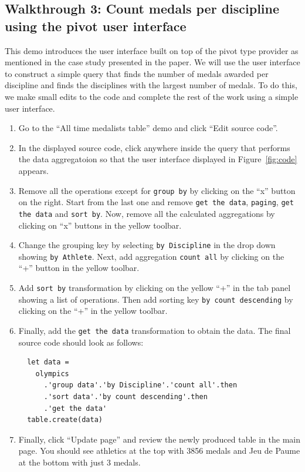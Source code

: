 \documentclass[a4paper,UKenglish]{darts}
\begin{document}
\begin{scope}
\subsection*{Walkthrough 3: Count medals per discipline using the pivot user interface}

This demo introduces the user interface built on top of the pivot type provider as mentioned in the
case study presented in the paper. We will use the user interface to construct a simple query that
finds the number of medals awarded per discipline and finds the disciplines with the largest number
of medals. To do this, we make small edits to the code and complete the rest of the work using
a simple user interface.

\begin{enumerate}
\item Go to the ``All time medalists table'' demo and click ``Edit source code''.
\item In the displayed source code, click anywhere inside the query that performs the data aggregatoion
  so that the user interface displayed in Figure~\ref{fig:code} appears.
\item Remove all the operations except for \texttt{group by} by clicking on the ``x'' button on 
  the right. Start from the last one and remove \texttt{get the data}, \texttt{paging},
  \texttt{get the data} and \texttt{sort by}. Now, remove all the calculated aggregations 
  by clicking on ``x'' buttons in the yellow toolbar. 
\item Change the grouping key by selecting \texttt{by Discipline} in the drop down
  showing \texttt{by Athlete}. Next, add aggregation \texttt{count all} by clicking on the 
  ``+'' button in the yellow toolbar.
\item Add \texttt{sort by} transformation by clicking on the yellow ``+'' in the tab panel showing
  a list of operations. Then add sorting key \texttt{by count descending} by clicking on the ``+''
  in the yellow toolbar.    
\item Finally, add the \texttt{get the data} transformation to obtain the data. The final source
  code should look as follows:
\begin{verbatim}
  let data =
    olympics
      .'group data'.'by Discipline'.'count all'.then
      .'sort data'.'by count descending'.then
      .'get the data'
  table.create(data)  
\end{verbatim}
\item Finally, click ``Update page'' and review the newly produced table in the main page. You should
  see athletics at the top with 3856 medals and Jeu de Paume at the bottom with just 3 medals.
\end{enumerate}
\end{scope}
\end{document}
